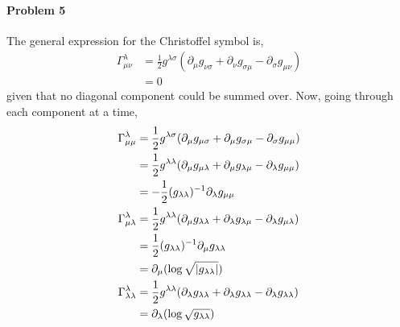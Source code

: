 \documentclass[10pt]{scrartcl}
\begin{document}
\paragraph{Problem 5} The general expression for the Christoffel symbol is,
\begin{align}
	\Gamma_{\mu\nu}^{\lambda} &= \frac{1}{2}g^{\lambda\sigma}(\partial_{\mu}g_{\nu\sigma}+\partial_\nu g_{\sigma\mu} - \partial_{\sigma}g_{\mu\nu})\\
	&= 0
\end{align}
given that no diagonal component could be summed over. Now, going through each component at a time,
\begin{align}
	\Gamma_{\mu\mu}^{\lambda} &= \frac{1}{2}g^{\lambda\sigma}(\partial_{\mu}g_{\mu\sigma}+\partial_\mu g_{\sigma\mu} - \partial_{\sigma}g_{\mu\mu})\\
	 &= \frac{1}{2}g^{\lambda\lambda}(\partial_{\mu}g_{\mu\lambda}+\partial_\mu g_{\lambda\mu} - \partial_{\lambda}g_{\mu\mu})\\
	 &= -\frac{1}{2}(g_{\lambda\lambda})^{-1}\partial_{\lambda}g_{\mu\mu}\\
	\Gamma_{\mu\lambda}^{\lambda} &= \frac{1}{2}g^{\lambda\lambda}(\partial_{\mu}g_{\lambda\lambda}+\partial_\lambda g_{\lambda\mu} - \partial_{\lambda}g_{\mu\lambda})\\
	&= \frac{1}{2}(g_{\lambda\lambda})^{-1}\partial_{\mu}g_{\lambda\lambda}\\
	&= \partial_{\mu}(\log\sqrt{\abs{g_{\lambda\lambda}}})\\
\Gamma_{\lambda\lambda}^{\lambda} &= \frac{1}{2}g^{\lambda\lambda}(\partial_{\lambda}g_{\lambda\lambda}+\partial_\lambda g_{\lambda\lambda} - \partial_{\lambda}g_{\lambda\lambda})\\
&= \partial_{\lambda}(\log{\sqrt{g_{\lambda\lambda}}})
\end{align}
\end{document}

